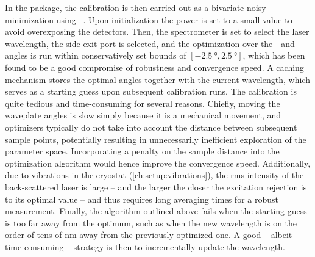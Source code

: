 In the \mjolnir package, the calibration is then carried out as a bivariate noisy minimization using ~\cite{Mayer2016}.
Upon initialization the power is set to a small value to avoid overexposing the detectors.
Then, the spectrometer is set to select the laser wavelength, the side exit port is selected, and the optimization over the \quarterwave- and \halfwave-angles is run within conservatively set bounds of $[\qty{-2.5}{\degree}, \qty{2.5}{\degree}]$, which has been found to be a good compromise of robustness and convergence speed.
A caching mechanism stores the optimal angles together with the current wavelength, which serves as a starting guess upon subsequent calibration runs.
The calibration is quite tedious and time-consuming for several reasons.
Chiefly, moving the waveplate angles is slow simply because it is a mechanical movement, and optimizers typically do not take into account the distance between subsequent sample points, potentially resulting in unnecessarily inefficient exploration of the parameter space.
Incorporating a penalty on the sample distance into the optimization algorithm would hence improve the convergence speed.
Additionally, due to vibrations in the cryostat (\cref{ch:setup:vibrations}), the \gls{rms} intensity of the back-scattered laser is large -- and the larger the closer the excitation rejection is to its optimal value -- and thus requires long averaging times for a robust measurement.
Finally, the algorithm outlined above fails when the starting guess is too far away from the optimum, such as when the new wavelength is on the order of tens of \unit{nm} away from the previously optimized one.
A good -- albeit time-consuming -- strategy is then to incrementally update the wavelength.

